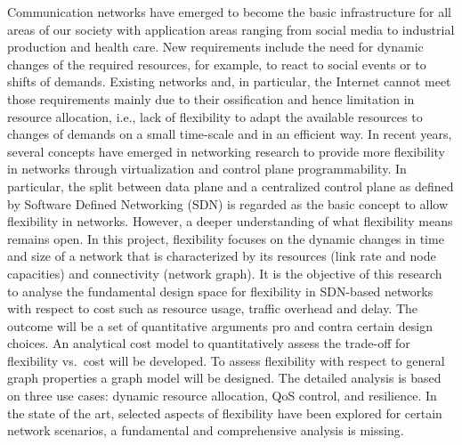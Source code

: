 Communication networks have emerged to become the basic infrastructure for all
areas of our society with application areas ranging from social media to
industrial production and health care. New requirements include the need for
dynamic changes of the required resources, for example, to react to social
events or to shifts of demands. Existing networks and, in particular, the
Internet cannot meet those requirements mainly due to their ossification and
hence limitation in resource allocation, i.e., lack of flexibility to adapt
the available resources to changes of demands on a small time-scale and in an
efficient way. In recent years, several concepts have emerged in networking
research to provide more flexibility in networks through virtualization and
control plane programmability. In particular, the split between data plane and
a centralized control plane as defined by Software Defined Networking (SDN) is
regarded as the basic concept to allow flexibility in networks. However, a
deeper understanding of what flexibility means remains open. In this project,
flexibility focuses on the dynamic changes in time and size of a network that
is characterized by its resources (link rate and node capacities) and
connectivity (network graph). It is the objective of this research to analyse
the fundamental design space for flexibility in SDN-based networks with
respect to cost such as resource usage, traffic overhead and delay. The
outcome will be a set of quantitative arguments pro and contra certain design
choices. An analytical cost model to quantitatively assess the trade-off for
flexibility vs.\ cost will be developed. To assess flexibility with respect to
general graph properties a graph model will be designed. The detailed analysis
is based on three use cases: dynamic resource allocation, QoS control, and
resilience. In the state of the art, selected aspects of flexibility have been
explored for certain network scenarios, a fundamental and comprehensive
analysis is missing.
